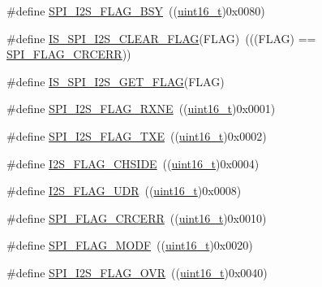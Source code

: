 \begin{DoxyCompactItemize}
\item 
\#define \hyperlink{group___s_p_i___i2_s__flags__definition_ga4551095df1365cf2a760282a34279b3c}{S\+P\+I\+\_\+\+I2\+S\+\_\+\+F\+L\+A\+G\+\_\+\+B\+SY}~((\hyperlink{_p_e___types_8h_a1f1825b69244eb3ad2c7165ddc99c956}{uint16\+\_\+t})0x0080)
\item 
\#define \hyperlink{group___s_p_i___i2_s__flags__definition_gab16c7f47712871b8f1b97de43841856f}{I\+S\+\_\+\+S\+P\+I\+\_\+\+I2\+S\+\_\+\+C\+L\+E\+A\+R\+\_\+\+F\+L\+AG}(F\+L\+AG)~(((F\+L\+AG) == \hyperlink{openmotestm_2library_2inc_2stm32f10x__spi_8h_a30fb6af50e1f3c61cb9de76b0101c889}{S\+P\+I\+\_\+\+F\+L\+A\+G\+\_\+\+C\+R\+C\+E\+RR}))
\item 
\#define \hyperlink{group___s_p_i___i2_s__flags__definition_ga1241471a018bc63ed140089ce8334b4f}{I\+S\+\_\+\+S\+P\+I\+\_\+\+I2\+S\+\_\+\+G\+E\+T\+\_\+\+F\+L\+AG}(F\+L\+AG)
\item 
\#define \hyperlink{group___s_p_i___i2_s__flags__definition_ga79ee46c44f8886193293528460fea6ed}{S\+P\+I\+\_\+\+I2\+S\+\_\+\+F\+L\+A\+G\+\_\+\+R\+X\+NE}~((\hyperlink{_p_e___types_8h_a1f1825b69244eb3ad2c7165ddc99c956}{uint16\+\_\+t})0x0001)
\item 
\#define \hyperlink{group___s_p_i___i2_s__flags__definition_ga4dbac2dc3e0cfbd7a019ebecc45d66d7}{S\+P\+I\+\_\+\+I2\+S\+\_\+\+F\+L\+A\+G\+\_\+\+T\+XE}~((\hyperlink{_p_e___types_8h_a1f1825b69244eb3ad2c7165ddc99c956}{uint16\+\_\+t})0x0002)
\item 
\#define \hyperlink{group___s_p_i___i2_s__flags__definition_gaf0d629fd522a15aff188236d3254b2ad}{I2\+S\+\_\+\+F\+L\+A\+G\+\_\+\+C\+H\+S\+I\+DE}~((\hyperlink{_p_e___types_8h_a1f1825b69244eb3ad2c7165ddc99c956}{uint16\+\_\+t})0x0004)
\item 
\#define \hyperlink{group___s_p_i___i2_s__flags__definition_gaec08a8ad716bef1b87a8c8d992ab89ec}{I2\+S\+\_\+\+F\+L\+A\+G\+\_\+\+U\+DR}~((\hyperlink{_p_e___types_8h_a1f1825b69244eb3ad2c7165ddc99c956}{uint16\+\_\+t})0x0008)
\item 
\#define \hyperlink{group___s_p_i___i2_s__flags__definition_ga30fb6af50e1f3c61cb9de76b0101c889}{S\+P\+I\+\_\+\+F\+L\+A\+G\+\_\+\+C\+R\+C\+E\+RR}~((\hyperlink{_p_e___types_8h_a1f1825b69244eb3ad2c7165ddc99c956}{uint16\+\_\+t})0x0010)
\item 
\#define \hyperlink{group___s_p_i___i2_s__flags__definition_gac7d3525ab98cc18f02270a4dba685897}{S\+P\+I\+\_\+\+F\+L\+A\+G\+\_\+\+M\+O\+DF}~((\hyperlink{_p_e___types_8h_a1f1825b69244eb3ad2c7165ddc99c956}{uint16\+\_\+t})0x0020)
\item 
\#define \hyperlink{group___s_p_i___i2_s__flags__definition_ga42001f769835f133600a021a29764254}{S\+P\+I\+\_\+\+I2\+S\+\_\+\+F\+L\+A\+G\+\_\+\+O\+VR}~((\hyperlink{_p_e___types_8h_a1f1825b69244eb3ad2c7165ddc99c956}{uint16\+\_\+t})0x0040)

\end{DoxyCompactItemize}
